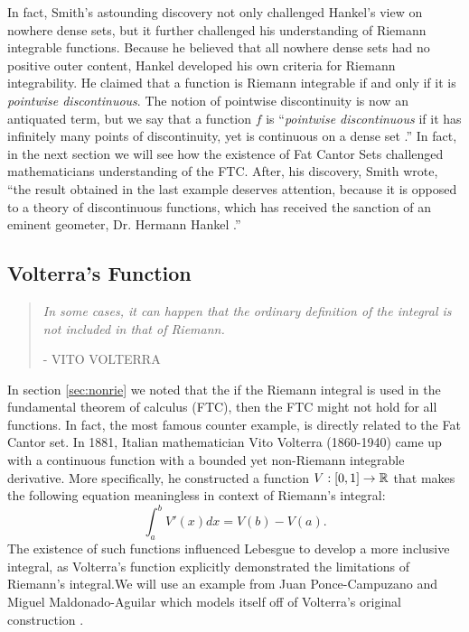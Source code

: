 \documentclass{article}
\theoremstyle{axiom} \newtheorem{axiom}{Axiom}
\theoremstyle{definition} \newtheorem{definition}{Definition}
\theoremstyle{example} \newtheorem{example}{Example}
\theoremstyle{proposition} \newtheorem{prop}{Proposition}
\theoremstyle{lemma} \newtheorem{lemma}{Lemma}
\begin{document}
In fact, Smith's astounding discovery not only challenged Hankel's  view on
nowhere dense sets, but it further challenged his understanding
of Riemann integrable functions. Because he believed that all nowhere dense
sets had no positive outer content, Hankel developed his own criteria for Riemann
integrability.  He claimed that a function is Riemann integrable if and only if 
it is \textit{pointwise discontinuous}.
The notion of pointwise discontinuity is now an antiquated term, but we say that
a function $f$ is ``\textit{pointwise discontinuous} if it has infinitely many 
points of discontinuity, yet is continuous on a dense set \cite{juan:2015}.'' In
fact, in the next section we will see how the existence of Fat Cantor Sets
challenged mathematicians understanding of the FTC. After, his discovery, 
Smith wrote, ``the result obtained in 
the last example deserves attention, because it is opposed to a theory of 
discontinuous functions, which has received the sanction of an eminent geometer, 
Dr. Hermann Hankel \cite{smith:1875}.''

\subsection{Volterra's Function}

\begin{quote}
	\textit{In some cases, it can happen that the ordinary definition of the
	integral is not included in that of Riemann.}

	\uppercase{\tiny{- Vito Volterra}}	
\end{quote}

In section \ref{sec:nonrie} we noted that the if the Riemann integral is used
in the fundamental theorem of calculus (FTC), then the FTC might not hold for
all functions. In fact, the most famous counter example, is directly related to the Fat Cantor set. 
In 1881, Italian mathematician Vito Volterra (1860-1940) came up with a continuous function with 
a bounded yet non-Riemann integrable derivative. More specifically, he
constructed a function $V:[0,1] \rightarrow \mathbb{R}$ that makes the following 
equation meaningless in context of Riemann's integral:
\begin{equation*}
	\int^b_a V'(x)dx = V(b) - V(a).
\end{equation*}
The existence of such functions influenced Lebesgue to develop a more inclusive 
integral, as Volterra's function explicitly demonstrated the limitations of Riemann's
integral.We will use an example from Juan Ponce-Campuzano and Miguel Maldonado-Aguilar
which models itself off of Volterra's original construction \cite{juan:2015}.
\end{document}
